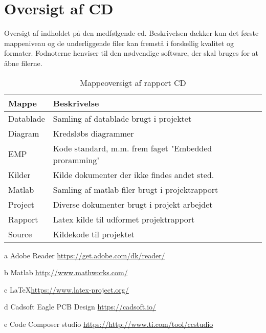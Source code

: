 \chapter{Oversigt af CD}\label{bilag:cd}
Oversigt af indholdet på den medfølgende cd. Beskrivelsen dækker kun det første mappeniveau og de underliggende filer kan fremstå i forskellig kvalitet og formater. Fodnoterne henviser til den nødvendige software, der skal bruges for at åbne filerne.

\begin{table}[h!]
\centering
\caption{Mappeoversigt af rapport CD}
\label{tab:ordliste}
\begin{threeparttable}
\begin{tabular}{l l}
\toprule
\multicolumn{1}{l}{Mappe}       &
\multicolumn{1}{l}{Beskrivelse}  \\ 
\midrule
Datablade					& Samling af datablade brugt i projektet \tnote{a}\\
Diagram						& Kredsløbs diagrammer\tnote{d} \\
EMP							& Kode standard, m.m. frem faget "Embedded proramming"\\  
Kilder						& Kilde dokumenter der ikke findes andet sted.\\
Matlab						& Samling af matlab filer brugt i projektrapport\tnote{b} \\
Project						& Diverse dokumenter brugt i projekt arbejdet\\
Rapport						& Latex kilde til udformet projektrapport\tnote{c} \\
Source                 		& Kildekode til projektet \tnote{e}\\
\bottomrule
\end{tabular}
\begin{tablenotes}
\item[a] Adobe Reader  \url{https://get.adobe.com/dk/reader/}
\item[b] Matlab \url{http://www.mathworks.com/}
\item[c] \LaTeX \url{https://www.latex-project.org/}
\item[d] Cadsoft Eagle PCB Design \url{https://cadsoft.io/}
\item[e] Code Composer studio \url{https://http://www.ti.com/tool/ccstudio}
\end{tablenotes}
\end{threeparttable}
\end{table}
\label{LastPage}
